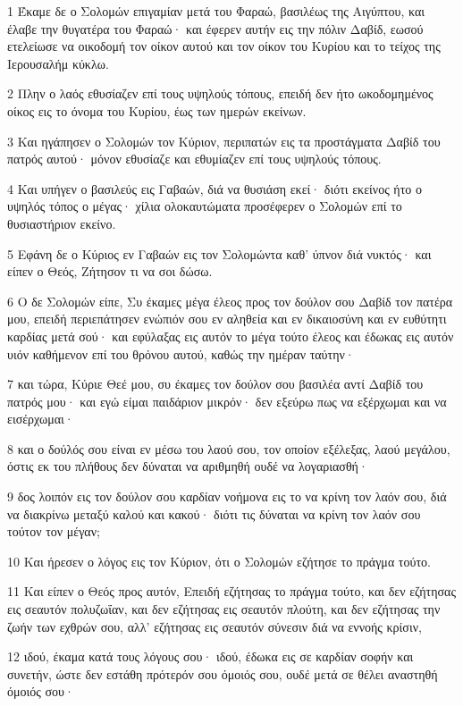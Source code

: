 \par 1 Έκαμε δε ο Σολομών επιγαμίαν μετά του Φαραώ, βασιλέως της Αιγύπτου, και έλαβε την θυγατέρα του Φαραώ· και έφερεν αυτήν εις την πόλιν Δαβίδ, εωσού ετελείωσε να οικοδομή τον οίκον αυτού και τον οίκον του Κυρίου και το τείχος της Ιερουσαλήμ κύκλω.
\par 2 Πλην ο λαός εθυσίαζεν επί τους υψηλούς τόπους, επειδή δεν ήτο ωκοδομημένος οίκος εις το όνομα του Κυρίου, έως των ημερών εκείνων.
\par 3 Και ηγάπησεν ο Σολομών τον Κύριον, περιπατών εις τα προστάγματα Δαβίδ του πατρός αυτού· μόνον εθυσίαζε και εθυμίαζεν επί τους υψηλούς τόπους.
\par 4 Και υπήγεν ο βασιλεύς εις Γαβαών, διά να θυσιάση εκεί· διότι εκείνος ήτο ο υψηλός τόπος ο μέγας· χίλια ολοκαυτώματα προσέφερεν ο Σολομών επί το θυσιαστήριον εκείνο.
\par 5 Εφάνη δε ο Κύριος εν Γαβαών εις τον Σολομώντα καθ' ύπνον διά νυκτός· και είπεν ο Θεός, Ζήτησον τι να σοι δώσω.
\par 6 Ο δε Σολομών είπε, Συ έκαμες μέγα έλεος προς τον δούλον σου Δαβίδ τον πατέρα μου, επειδή περιεπάτησεν ενώπιόν σου εν αληθεία και εν δικαιοσύνη και εν ευθύτητι καρδίας μετά σού· και εφύλαξας εις αυτόν το μέγα τούτο έλεος και έδωκας εις αυτόν υιόν καθήμενον επί του θρόνου αυτού, καθώς την ημέραν ταύτην·
\par 7 και τώρα, Κύριε Θεέ μου, συ έκαμες τον δούλον σου βασιλέα αντί Δαβίδ του πατρός μου· και εγώ είμαι παιδάριον μικρόν· δεν εξεύρω πως να εξέρχωμαι και να εισέρχωμαι·
\par 8 και ο δούλός σου είναι εν μέσω του λαού σου, τον οποίον εξέλεξας, λαού μεγάλου, όστις εκ του πλήθους δεν δύναται να αριθμηθή ουδέ να λογαριασθή·
\par 9 δος λοιπόν εις τον δούλον σου καρδίαν νοήμονα εις το να κρίνη τον λαόν σου, διά να διακρίνω μεταξύ καλού και κακού· διότι τις δύναται να κρίνη τον λαόν σου τούτον τον μέγαν;
\par 10 Και ήρεσεν ο λόγος εις τον Κύριον, ότι ο Σολομών εζήτησε το πράγμα τούτο.
\par 11 Και είπεν ο Θεός προς αυτόν, Επειδή εζήτησας το πράγμα τούτο, και δεν εζήτησας εις σεαυτόν πολυζωΐαν, και δεν εζήτησας εις σεαυτόν πλούτη, και δεν εζήτησας την ζωήν των εχθρών σου, αλλ' εζήτησας εις σεαυτόν σύνεσιν διά να εννοής κρίσιν,
\par 12 ιδού, έκαμα κατά τους λόγους σου· ιδού, έδωκα εις σε καρδίαν σοφήν και συνετήν, ώστε δεν εστάθη πρότερόν σου όμοιός σου, ουδέ μετά σε θέλει αναστηθή όμοιός σου·
